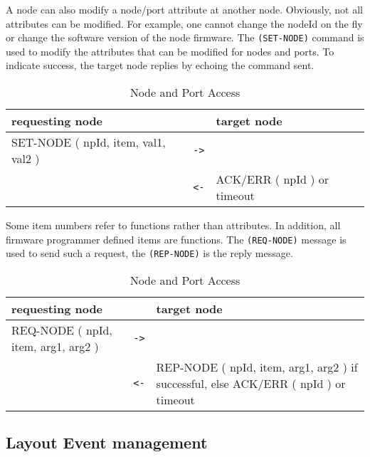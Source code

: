 A node can also modify a node/port attribute at another node. Obviously, not all attributes can be modified. For example, one cannot change the nodeId on the fly or change the software version of the node firmware. The \texttt{(SET-NODE)} command is used to modify the attributes that can be modified for nodes and ports. To indicate success, the target node replies by echoing the command sent.

\begin{table}[ht!]
    \begin{center}
        \caption{Node and Port Access}
        \begin{tabular}{|p{}| c |p{}|}
            \toprule
            \textbf{requesting node} & & \textbf{ target node} \\
            \midrule
            SET-NODE ( npId, item, val1, val2 ) & \texttt{->} &  \\
            \midrule
            & \texttt {<-} & ACK/ERR ( npId ) or timeout \\
            \bottomrule
        \end{tabular}
    \end{center}
\end{table}

Some item numbers refer to functions rather than attributes. In addition, all firmware programmer defined items are functions.  The \texttt{(REQ-NODE)} message is used to send such a request, the \texttt{(REP-NODE)} is the reply message.

\begin{table}[ht!]
    \begin{center}
        \caption{Node and Port Access}
        \begin{tabular}{|p{}| c |p{}|}
            \toprule
            \textbf{requesting node} & & \textbf{ target node} \\
            \midrule
            REQ-NODE ( npId, item, arg1, arg2 ) & \texttt{->} &  \\
            \midrule
            & \texttt{<-} & REP-NODE ( npId, item, arg1, arg2 ) if successful, else ACK/ERR ( npId ) or timeout \\
            \bottomrule
        \end{tabular}
    \end{center}
\end{table}

\subsection{Layout Event management}


